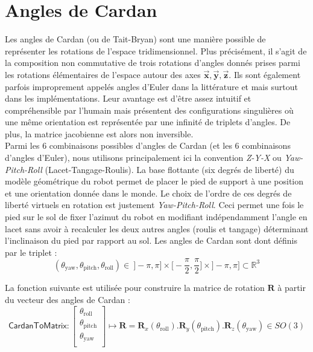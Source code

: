 \section{Angles de Cardan\label{sec:angles_euler}}

Les angles de Cardan (ou de Tait-Bryan) sont une manière possible de 
représenter les rotations de l'espace tridimensionnel.
Plus précisément, il s'agit de la composition non commutative
de trois rotations d'angles donnés prises parmi les rotations élémentaires 
de l'espace autour des axes $\vec{\bm{x}}, \vec{\bm{y}}, \vec{\bm{z}}$.
Ils sont également parfois improprement appelés angles d'Euler dans la littérature 
et mais surtout dans les implémentations.
Leur avantage est d'être assez intuitif
et compréhensible par l'humain mais présentent
des configurations singulières où une même orientation
est représentée par une infinité de triplets d'angles.
De plus, la matrice jacobienne est alors non inversible.\\

Parmi les $6$ combinaisons possibles d'angles de Cardan
(et les $6$ combinaisons d'angles d'Euler), 
nous utilisons principalement ici la convention \textit{Z-Y-X} ou \textit{Yaw-Pitch-Roll} 
(Lacet-Tangage-Roulis).
La base flottante (six degrés de liberté) du modèle géométrique 
du robot permet de placer le pied de support à une position
et une orientation donnée dans le monde. 
Le choix de l'ordre de ces degrés de liberté \og virtuels \fg en rotation 
est justement \textit{Yaw-Pitch-Roll}.
Ceci permet une fois le pied sur le sol de fixer l'azimut du robot
en modifiant indépendamment l'angle en lacet sans avoir à recalculer 
les deux autres angles (roulis et tangage) déterminant l'inclinaison 
du pied par rapport au sol.
Les angles de Cardan sont dont définis par le triplet :
$$
(\theta_{\text{yaw}}, \theta_{\text{pitch}}, \theta_{\text{roll}}) 
\in~\big]-\pi,\pi\big] \times \big[-\frac{\pi}{2},\frac{\pi}{2}\big] \times \big]-\pi,\pi\big] \subset \mathbb{R}^3
$$

La fonction suivante est utilisée pour construire la matrice de rotation
$\bm{R}$ à partir du vecteur des angles de Cardan :
$$
\mathsf{CardanToMatrix} :
\begin{bmatrix}
\theta_{\text{roll}} \\
\theta_{\text{pitch}} \\
\theta_{\text{yaw}} \\
\end{bmatrix}
\longmapsto
\bm{R} =
\bm{R}_x(\theta_{\text{roll}}) . \bm{R}_y(\theta_{\text{pitch}}) . \bm{R}_z(\theta_{\text{yaw}})
\in SO(3)
$$

